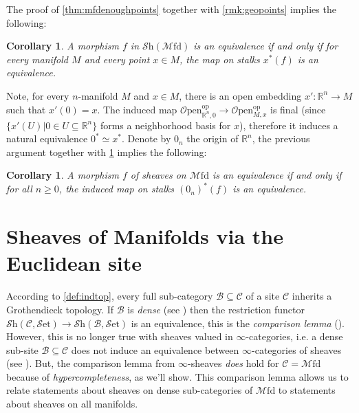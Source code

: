 \documentclass[a4paper]{book}
\newcommand{\lB}{\mathcal{B}}
\newcommand{\lC}{\mathcal{C}}
\newcommand{\lM}{\mathcal{M}}
\newcommand{\lO}{\mathcal{O}}
\newcommand{\bR}{\mathbb{R}}
\newcommand{\lS}{\mathcal{S}}
\newcommand{\op}{\mathrm{op}}
\newcommand{\set}{\lS\mathrm{et}} %
\newcommand{\Shv}{\lS\mathrm{h}} %
\newcommand{\Open}{\lO\mathrm{pen}} %
\newcommand{\Mfd}{\lM\mathrm{fd}} %
\newtheorem{corollary}[equation]{Corollary}
\theoremstyle{definition}
\theoremstyle{remark}
\numberwithin{equation}{section}
\begin{document}
The proof of \cref{thm:mfdenoughpoints} together with \cref{rmk:geopoints} implies the following: 
\begin{corollary}\label{cor:points}
  A morphism $f$ in $\Shv(\Mfd)$ is an equivalence if and only if for every manifold $M$ and every point $x \in M$, the map on stalks $x^*(f)$ is an equivalence.
\end{corollary}
Note, for every $n$-manifold $M$ and $x\in M$, there is an open embedding $x':\bR^n\to M$ such that $x'(0)=x$. The induced map $\Open_{\bR^n,0}^{\op}\to\Open_{M,x}^{\op}$ is final (since $\{x'(U)|0\in U\subseteq\bR^n\}$ forms a neighborhood basis for $x$), therefore it induces a natural equivalence $0^*\simeq x^*$. Denote by $0_n$ the origin of $\bR^n$, the previous argument together with \cref{cor:points} implies the following:
\begin{corollary}
  A morphism $f$ of sheaves on $\Mfd$ is an equivalence if and only if for all $n \geq 0$, the induced map on stalks $(0_n)^*(f) $ is an equivalence.
\end{corollary}

\section{Sheaves of Manifolds via the Euclidean site}

According to \cref{def:indtop}, every full sub-category $\lB\subseteq\lC$ of a site $\lC$ inherits a Grothendieck topology. If $\lB$ is \emph{dense} (see \cite[Definition 2.2.1]{johnstone2002elephanti}) then the restriction functor $\Shv(\lC,\set)\to\Shv(\lB,\set)$ is an equivalence, this is the \emph{comparison lemma} (\cite[Theorem 2.2.3]{johnstone2002elephanti}). However, this is no longer true with sheaves valued in $\infty$-categories, i.e. a dense sub-site $\lB\subseteq\lC$ does not induce an equivalence between $\infty$-categories of sheaves (see \cite[Counterexample 20.4.0.1]{lurie2018sag}). But, the comparison lemma from $\infty$-sheaves \emph{does} hold for $\lC=\Mfd$ because of \emph{hypercompleteness}, as we'll show. This comparison lemma allows us to relate statements about sheaves on dense sub-categories of $\Mfd$ to statements about sheaves on all manifolds.
\end{document}
